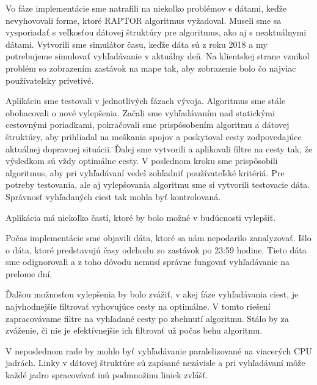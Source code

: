 Vo fáze implementácie sme natrafili na niekoľko problémov s dátami, keďže nevyhovovali forme, ktoré RAPTOR algoritmus vyžadoval. Museli sme sa vysporiadať s veľkosťou dátovej štruktúry pre algoritmus, ako aj s neaktuálnymi dátami. Vytvorili sme simulátor času, keďže dáta sú z roku 2018 a my potrebujeme simulovať vyhľadávanie v aktuálny deň. Na klientskej strane vznikol problém so zobrazením zastávok na mape tak, aby zobrazenie bolo čo najviac používateľsky prívetivé.

Aplikáciu sme testovali v jednotlivých fázach vývoja. Algoritmus sme stále obohacovali o nové vylepšenia. Začali sme vyhľadávaním nad statickými cestovnými poriadkami, pokračovali sme prispôsobením algoritmu a dátovej štruktúry, aby prihliadal na meškania spojov a poskytoval cesty zodpovedajúce aktuálnej dopravnej situácii. Ďalej sme vytvorili a aplikovali filtre na cesty tak, že výsledkom sú vždy optimálne cesty. V poslednom kroku sme prispôsobili algoritmus, aby pri vyhľadávaní vedel zohľadniť používateľské kritériá. Pre potreby testovania, ale aj vylepšovania algoritmu sme si vytvorili testovacie dáta. Správnosť vyhľadaných ciest tak mohla byť kontrolovaná. 

Aplikácia má niekoľko častí, ktoré by bolo možné v budúcnosti vylepšiť. 

Počas implementácie sme objavili dáta, ktoré sa nám nepodarilo zanalyzovať. Išlo o dáta, ktoré predstavujú časy odchodu zo zastávok po 23:59 hodine. Tieto dáta sme odignorovali a z toho dôvodu nemusí správne fungovať vyhľadávanie na prelome dní. 

Ďalšou možnosťou vylepšenia by bolo zvážiť, v akej fáze vyhľadávania ciest, je najvhodnejšie filtrovať vyhovujúce cesty na optimálne. V tomto riešení zapracovávame filtre na vyhľadané cesty po zbehnutí algoritmu. Stálo by za zváženie, či nie je efektívnejšie ich filtrovať už počas behu algoritmu.

V neposlednom rade by mohlo byť vyhľadávanie paralelizované na viacerých CPU jadrách. Linky v dátovej štruktúre sú zapísané nezávisle a pri vyhľadávaní môže každé jadro spracovávať inú podmnožinu liniek zvlášť.
